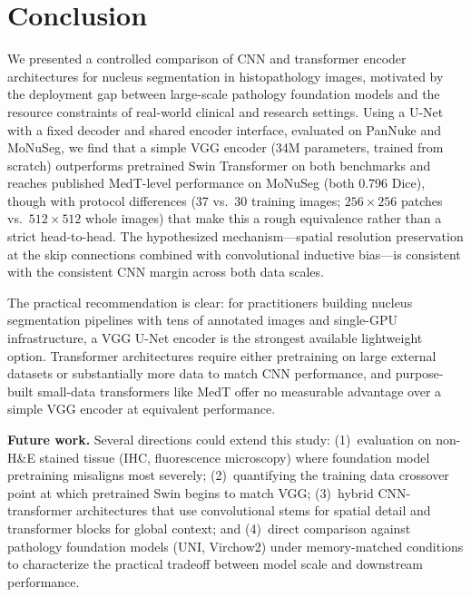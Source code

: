 \documentclass{article}
\begin{document}
\section{Conclusion}

We presented a controlled comparison of CNN and transformer encoder architectures for nucleus segmentation in histopathology images, motivated by the deployment gap between large-scale pathology foundation models and the resource constraints of real-world clinical and research settings. Using a U-Net with a fixed decoder and shared encoder interface, evaluated on PanNuke and MoNuSeg, we find that a simple VGG encoder (34M parameters, trained from scratch) outperforms pretrained Swin Transformer on both benchmarks and reaches published MedT-level performance on MoNuSeg (both 0.796 Dice), though with protocol differences (37 vs.\ 30 training images; $256\times256$ patches vs.\ $512\times512$ whole images) that make this a rough equivalence rather than a strict head-to-head. The hypothesized mechanism---spatial resolution preservation at the skip connections combined with convolutional inductive bias---is consistent with the consistent CNN margin across both data scales.

The practical recommendation is clear: for practitioners building nucleus segmentation pipelines with tens of annotated images and single-GPU infrastructure, a VGG U-Net encoder is the strongest available lightweight option. Transformer architectures require either pretraining on large external datasets or substantially more data to match CNN performance, and purpose-built small-data transformers like MedT offer no measurable advantage over a simple VGG encoder at equivalent performance.

\textbf{Future work.} Several directions could extend this study: (1)~evaluation on non-H\&E stained tissue (IHC, fluorescence microscopy) where foundation model pretraining misaligns most severely; (2)~quantifying the training data crossover point at which pretrained Swin begins to match VGG; (3)~hybrid CNN-transformer architectures that use convolutional stems for spatial detail and transformer blocks for global context; and (4)~direct comparison against pathology foundation models (UNI, Virchow2) under memory-matched conditions to characterize the practical tradeoff between model scale and downstream performance.
\end{document}

